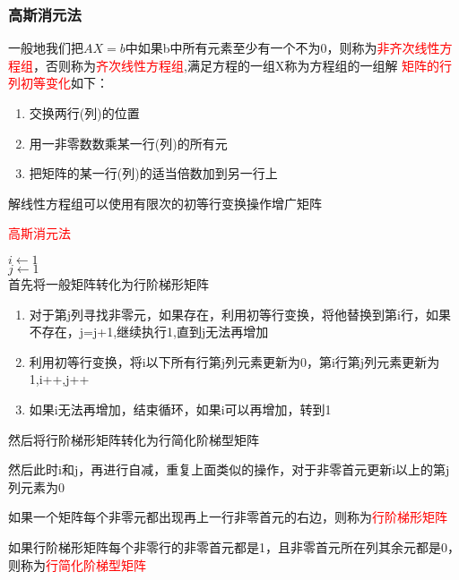 \subsubsection{高斯消元法}



一般地我们把$AX=b$中如果b中所有元素至少有一个不为0，则称为\textcolor{red}{非齐次线性方程组}，否则称为\textcolor{red}{齐次线性方程组},满足方程的一组X称为方程组的一组解
\textcolor{red}{矩阵的行列初等变化}如下：

\begin{enumerate}
    \item 交换两行(列)的位置
    \item 用一非零数数乘某一行(列)的所有元
    \item 把矩阵的某一行(列)的适当倍数加到另一行上
\end{enumerate}


解线性方程组可以使用有限次的初等行变换操作增广矩阵

\begin{algorithm}[H]
    \caption[]{\textcolor{red}{高斯消元法}}
    $i\leftarrow 1$\\
    $j\leftarrow 1$\\
    首先将一般矩阵转化为行阶梯形矩阵
    \begin{enumerate}
        \item 对于第j列寻找非零元，如果存在，利用初等行变换，将他替换到第i行，如果不存在，j=j+1,继续执行1,直到j无法再增加
        \item 利用初等行变换，将i以下所有行第j列元素更新为0，第i行第j列元素更新为1,i++,j++
        \item 如果i无法再增加，结束循环，如果i可以再增加，转到1
    \end{enumerate}

    然后将行阶梯形矩阵转化为行简化阶梯型矩阵

    然后此时i和j，再进行自减，重复上面类似的操作，对于非零首元更新i以上的第j列元素为0
\end{algorithm}

如果一个矩阵每个非零元都出现再上一行非零首元的右边，则称为\textcolor{red}{行阶梯形矩阵}

如果行阶梯形矩阵每个非零行的非零首元都是1，且非零首元所在列其余元都是0，则称为\textcolor{red}{行简化阶梯型矩阵}

